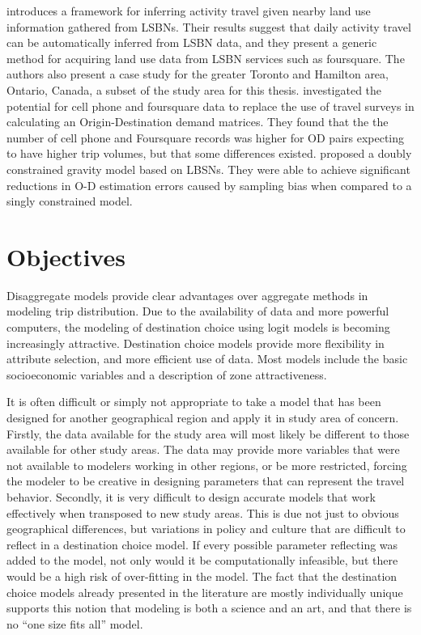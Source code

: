 \textcite{abdulazim2015framework} introduces a framework for inferring activity travel given nearby land use information gathered from LSBNs. Their results suggest that daily activity travel can be automatically inferred from LSBN data, and they present a generic method for acquiring land use data from LSBN services such as foursquare. The authors also present a case study for the  greater Toronto and Hamilton area, Ontario, Canada, a subset of the study area for this thesis.
\textcite{sa2015origin} investigated the potential for cell phone and foursquare data to replace the use of travel surveys in calculating an Origin-Destination demand matrices. They found that the the number of cell phone and Foursquare records was higher for OD pairs expecting to have higher trip volumes, but that some differences existed.
\textcite{jin2014location} proposed a doubly constrained gravity model based on LBSNs. They were able to achieve significant reductions in O-D estimation errors caused by sampling bias when compared to a singly constrained model.

\section{Objectives}
Disaggregate models provide clear advantages over aggregate methods in modeling trip distribution. Due to the availability of data and more powerful computers, the modeling of destination choice using logit models is becoming increasingly attractive. Destination choice models provide more flexibility in attribute selection, and more efficient use of data. Most models include the basic socioeconomic variables and a description of zone attractiveness. 

It is often difficult or simply not appropriate to take a model that has been designed for another geographical region and apply it in study area of concern. Firstly, the data available for the study area will most likely be different to those available for other study areas. The data may provide more variables that were not available to modelers working in other regions, or be more restricted, forcing the modeler to be creative in designing parameters that can represent the travel behavior. Secondly, it is very difficult to design accurate models that work effectively when transposed to new study areas. This is due not just to obvious geographical differences, but variations in policy and culture that are difficult to reflect in a destination choice model. If every possible parameter reflecting was added to the model, not only would it be computationally infeasible, but there would be a high risk of over-fitting in the model. The fact that the destination choice models already presented in the literature are mostly individually unique supports this notion that modeling is both a science and an art, and that there is no \enquote{one size fits all} model.

